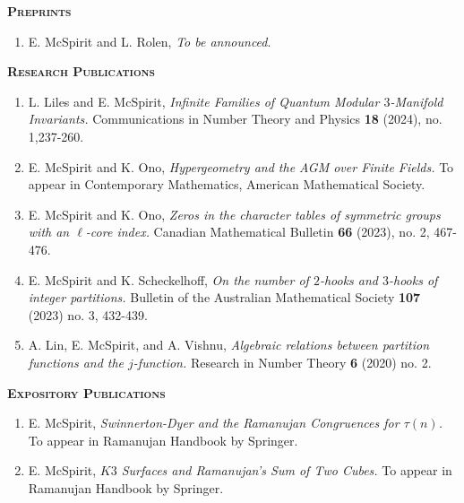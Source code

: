 \documentclass[11pt]{amsart}
\theoremstyle{remark}
\begin{document}
{{{\vspace{.1in}




\large{\textbf{\textsc{Preprints}}}
\begin{enumerate}[label=\arabic*.]
\item E. McSpirit and L. Rolen, \textit{To be announced}.	
\end{enumerate}


\large{\textbf{\textsc{Research Publications}}}
\begin{enumerate}[label=\arabic*.]
\item L. Liles and E. McSpirit, \textit{Infinite Families of Quantum Modular $3$-Manifold Invariants.} Communications in Number Theory and Physics \textbf{18} (2024), no. 1,237-260.  
\item E. McSpirit and K. Ono, \textit{Hypergeometry and the AGM over Finite Fields.} To appear in Contemporary Mathematics, American Mathematical Society. 
\item E. McSpirit and K. Ono, \textit{Zeros in the character tables of symmetric groups with an $\ell$-core index.} Canadian Mathematical Bulletin \textbf{66} (2023), no. 2, 467-476.
\item E. McSpirit and K. Scheckelhoff, \textit{On the number of $2$-hooks and $3$-hooks of integer partitions.} Bulletin of the Australian Mathematical Society \textbf{107} (2023) no. 3, 432-439.
\item A. Lin, E. McSpirit, and A. Vishnu, \textit{Algebraic relations between partition functions and the $j$-function.} Research in Number Theory \textbf{6} (2020) no. 2.
\end{enumerate}

\vspace{.1in}

\large{\textbf{\textsc{Expository Publications}}}
\begin{enumerate}[label=\arabic*.]
\item E. McSpirit, \textit{Swinnerton-Dyer and the Ramanujan Congruences for $\tau(n)$.} To appear in Ramanujan Handbook by Springer.
\item  E. McSpirit, \textit{$K3$ Surfaces and Ramanujan's Sum of Two Cubes.} To appear in Ramanujan Handbook by Springer.
\end{enumerate}

}}}
\end{document}
